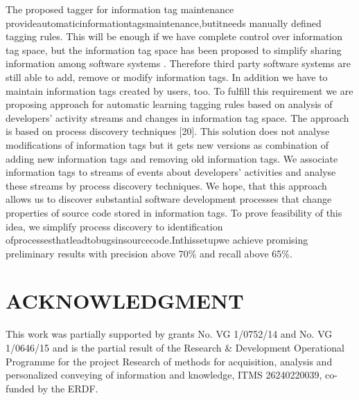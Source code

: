 \documentclass[18px,a4, conference]{IEEEtran}
\begin{document}
The proposed tagger for information tag maintenance provideautomaticinformationtagsmaintenance,butitneeds manually deﬁned tagging rules. This will be enough if we have complete control over information tag space, but the information tag space has been proposed to simplify sharing information among software systems \cite{Bieliková2012}
. Therefore third party software systems are still able to add, remove or modify information tags. In addition we have to maintain information tags created by users, too. To fulﬁll this requirement we are proposing approach for automatic learning tagging rules based on analysis of developers’ activity streams and changes in information tag space. The approach is based on process discovery techniques [20]. This solution does not analyse modiﬁcations of information tags but it gets new versions as combination of adding new information tags and removing old information tags. We associate information tags to streams of events about developers’ activities and analyse these streams by process discovery techniques. We
hope, that this approach allows us to discover substantial software development processes that change properties of source code stored in information tags. To prove feasibility of this idea, we simplify process discovery to identiﬁcation ofprocessesthatleadtobugsinsourcecode.Inthissetupwe achieve promising preliminary results with precision above 70\% and recall above 65\%.                            %
\section*{ACKNOWLEDGMENT} 
\label{sec:ACKNOWLEDGMENT}
This work was partially supported by grants No. VG 1/0752/14 and No. VG 1/0646/15 and is the partial result of the Research \& Development Operational Programme for the project Research of methods for acquisition, analysis and personalized conveying of information and knowledge, ITMS 26240220039, co-funded by the ERDF.




\end{document}
